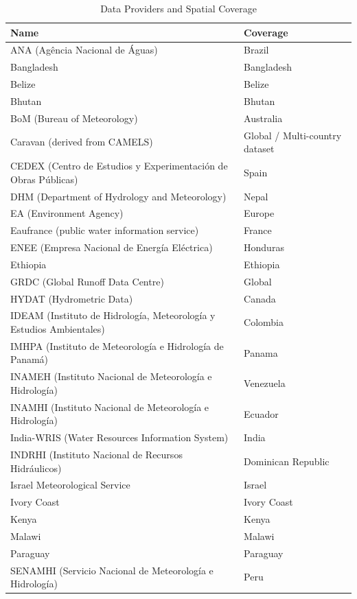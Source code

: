 \begin{table}[!htbp]
\centering
\footnotesize
\renewcommand{\arraystretch}{0.95}
\caption{Data Providers and Spatial Coverage}
\label{tab:providers}
\begin{tabular}{@{}L{0.64\textwidth}L{0.30\textwidth}@{}}
\toprule
\textbf{Name} & \textbf{Coverage} \\
\midrule
ANA (Agência Nacional de Águas) & Brazil \\
Bangladesh & Bangladesh \\
Belize & Belize \\
Bhutan & Bhutan \\
BoM (Bureau of Meteorology) & Australia \\
Caravan (derived from CAMELS) & Global / Multi-country dataset \\
CEDEX (Centro de Estudios y Experimentación de Obras Públicas) & Spain \\
DHM (Department of Hydrology and Meteorology) & Nepal \\
EA (Environment Agency) & Europe \\
Eaufrance (public water information service) & France \\
ENEE (Empresa Nacional de Energía Eléctrica) & Honduras \\
Ethiopia & Ethiopia \\
GRDC (Global Runoff Data Centre) & Global \\
HYDAT (Hydrometric Data) & Canada \\
IDEAM (Instituto de Hidrología, Meteorología y Estudios Ambientales) & Colombia \\
IMHPA (Instituto de Meteorología e Hidrología de Panamá) & Panama \\
INAMEH (Instituto Nacional de Meteorología e Hidrología) & Venezuela \\
INAMHI (Instituto Nacional de Meteorología e Hidrología) & Ecuador \\
India-WRIS (Water Resources Information System) & India \\
INDRHI (Instituto Nacional de Recursos Hidráulicos) & Dominican Republic \\
Israel Meteorological Service & Israel \\
Ivory Coast & Ivory Coast \\
Kenya & Kenya \\
Malawi & Malawi \\
Paraguay & Paraguay \\
SENAMHI (Servicio Nacional de Meteorología e Hidrología) & Peru \\

\end{tabular}
\end{table}

